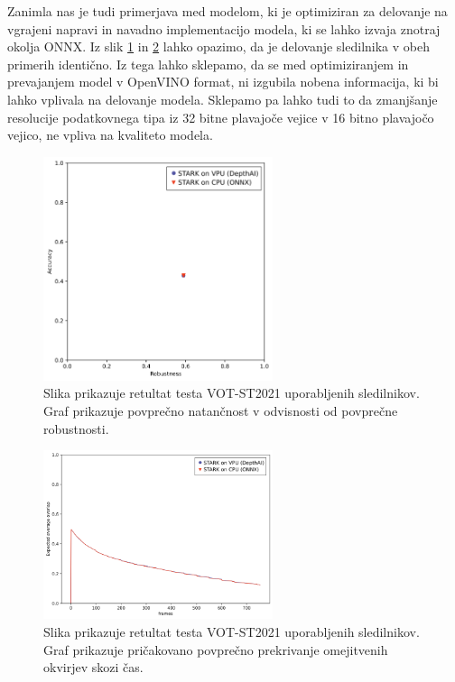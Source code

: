 \documentclass[a4paper,12pt,openright]{book}
\begin{document}
Zanimla nas je tudi primerjava med modelom, ki je optimiziran za delovanje na vgrajeni napravi in navadno implementacijo modela, ki se lahko izvaja znotraj okolja ONNX. Iz slik \ref{img:vot_bs_res} in \ref{img:vot_bs_frames} lahko opazimo, da je delovanje sledilnika v obeh primerih identično. Iz tega lahko sklepamo, da se med optimiziranjem in prevajanjem model v OpenVINO format, ni izgubila nobena informacija, ki bi lahko vplivala na delovanje modela. Sklepamo pa lahko tudi to da zmanjšanje resolucije podatkovnega tipa iz 32 bitne plavajoče vejice v 16 bitno plavajočo vejico, ne vpliva na kvaliteto modela.

\begin{figure}[htb]
    \begin{center}
        \includegraphics[width=0.6\textwidth]{img/vot_bs_acc.png}
    \end{center}
    \caption{Slika prikazuje retultat testa VOT-ST2021 uporabljenih sledilnikov. Graf prikazuje povprečno natančnost v odvisnosti od povprečne robustnosti.}
    \label{img:vot_bs_res}
\end{figure}

\begin{figure}[htb]
    \begin{center}
        \includegraphics[width=0.6\textwidth]{img/vot_bs_frames.png}
    \end{center}
    \caption{Slika prikazuje retultat testa VOT-ST2021 uporabljenih sledilnikov. Graf prikazuje pričakovano povprečno prekrivanje omejitvenih okvirjev skozi čas.}
    \label{img:vot_bs_frames}
\end{figure}
\end{document}
